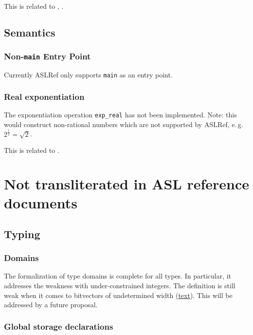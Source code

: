 \documentclass{book}
\begin{document}
This is related to , .

\section{Semantics}

\subsection{Non-\texttt{main} Entry Point}
Currently ASLRef only supports \texttt{main} as an entry point.

\subsection{Real exponentiation}

The exponentiation operation \texttt{exp\_real} has not been implemented.
%
Note: this would construct non-rational numbers which are not supported by
ASLRef, e.\,g.\ $2^\frac{1}{2} = \sqrt{2}$.

This is related to .

\chapter{Not transliterated in ASL reference documents}

\section{Typing}

\subsection{Domains}

The formalization of type domains is complete for all types.
In particular, it addresses the weakness with under-constrained integers.
The definition is still weak when it comes to bitvectors of undetermined width (\url{text}).
This will be addressed by a future proposal.

\subsection{Global storage declarations}
\end{document}

